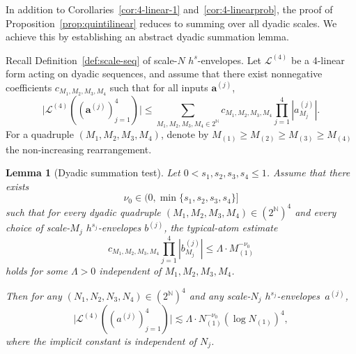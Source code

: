 \documentclass[11pt,reqno,english]{amsart}
\numberwithin{equation}{section}
\theoremstyle{plain}
\newtheorem{lemma}[theorem]{Lemma}
\theoremstyle{definition}
\theoremstyle{remark}
\newcommand{\N}{\mathbb{N}}
\begin{document}
In addition to Corollaries~\ref{cor:4-linear-1} and~\ref{cor:4-linearprob}, the proof of Proposition~\ref{prop:quintilinear} reduces to summing over all dyadic scales. We achieve this by establishing an abstract dyadic summation lemma.

\medskip

Recall Definition~\ref{def:scale-seq} of scale-$N$ $h^s$-envelopes.
Let $\mathcal{L}^{(4)}$ be a 4-linear form acting on dyadic sequences, and assume that there exist
nonnegative coefficients $c_{M_1,M_2,M_3,M_4}$ such that for all inputs $\mathbf{a}^{(j)}$,
\[
\big|\mathcal{L}^{(4)}((\mathbf{a}^{(j)})_{j=1}^4)\big|\leq
\sum_{M_1,M_2,M_3,M_4\in 2^{\mathbb N}}
c_{M_1,M_2,M_3,M_4}\prod_{j=1}^4 |a^{(j)}_{M_j}|.
\]
For a quadruple $(M_1,M_2,M_3,M_4)$, denote by
$M_{(1)}\ge M_{(2)}\ge M_{(3)}\ge M_{(4)}$
the non-increasing rearrangement.

\begin{lemma}[Dyadic summation test]\label{lem:sum-abstract}
	Let $0<s_1,s_2,s_3,s_4\leq 1$. Assume that there exists
	\[
	\nu_0\in \Big(0,\min\{s_1,s_2,s_3,s_4\}\Big]
	\]
	such that for every dyadic quadruple $(M_1,M_2,M_3,M_4)\in (2^{\N})^4$ and every choice of scale-$M_j$ $h^{s_j}$-envelopes $b^{(j)}$, the typical-atom estimate
	\begin{equation}\label{eq:typical-atom-output-gain}
		c_{M_1,M_2,M_3,M_4}\prod_{j=1}^4 |b^{(j)}_{M_j}|
		\leq
		\Lambda\cdot M_{(1)}^{-\nu_0}
	\end{equation}
	holds for some $\Lambda>0$ independent of $M_1,M_2,M_3,M_4$.

	Then for any $(N_1,N_2,N_3,N_4)\in(2^{\N})^4$ and any scale-$N_j$ $h^{s_j}$-envelopes~$a^{(j)}$,
	\begin{equation}\label{eq:dyadic-sum-output-gain}
		\big|\mathcal{L}^{(4)}((a^{(j)})_{j=1}^4)\big|
		\lesssim
		\Lambda\cdot N_{(1)}^{-\nu_0}(\log N_{(1)})^4,
	\end{equation}
	where the implicit constant is independent of $N_j$.
\end{lemma}
\end{document}
